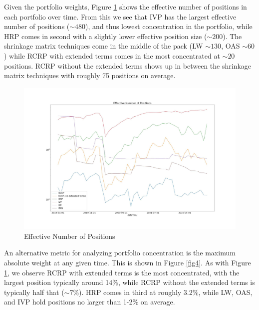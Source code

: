 \documentclass[10pt,twoside,titlepage]{article}   %
\begin{document}
Given the portfolio weights, Figure \ref{fig3} shows the effective number of positions in each portfolio over time. 
From this we see that IVP has the largest effective number of positions ($\sim 480$), and thus lowest concentration in the portfolio, 
while HRP comes in second with a slightly lower effective position size ($\sim 200$). 
The shrinkage matrix techniques come in the middle of the pack (LW $\sim 130$, OAS $\sim 60$) 
while RCRP with extended terms comes in the most concentrated at $\sim 20$ positions. 
RCRP without the extended terms shows up in between the shrinkage matrix techniques with roughly 75 positions on average.
\noindent
\begin{figure}[!h]
\includegraphics[width = 1.00\textwidth]{image3.jpg}
\vspace{-1.75\baselineskip}
\caption{Effective Number of Positions}
\label{fig3}
\end{figure}
An alternative metric for analyzing portfolio concentration is the maximum absolute weight at any given time. 
This is shown in Figure \ref{fig4}. 
As with Figure \ref{fig3}, we observe RCRP with extended terms is the most concentrated, 
with the largest position typically around 14\%, while RCRP without the extended terms is typically half that ($\sim7$\%). 
HRP comes in third at roughly 3.2\%, while LW, OAS, and IVP hold positions no larger than 1-2\% on average.
\noindent
\end{document}
